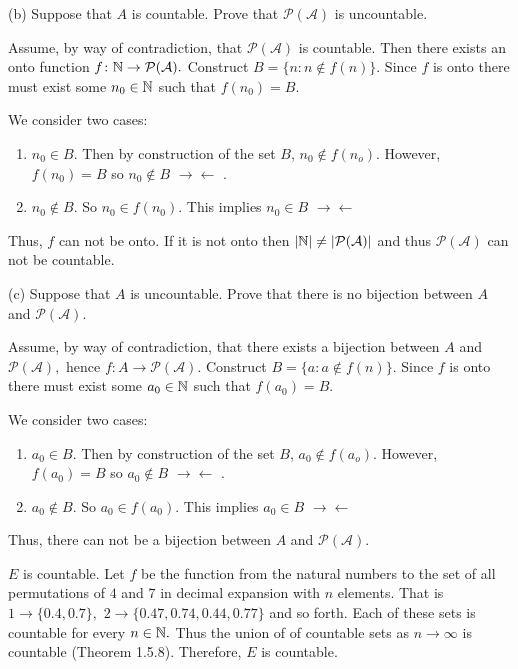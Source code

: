 \documentclass{report}
\newcommand{\contra}{
$\rightarrow\!\leftarrow$
}
\begin{document}
\bigskip
(b) Suppose that $A$ is countable. Prove that $\mathcal{P}(\mathcal{A})$ is uncountable.
\bigskip
\par
\sol

Assume, by way of contradiction, that $\mathcal{P}(\mathcal{A})$ is countable. Then there exists an onto function $f\colon \NN \rightarrow \mathcal{P}(\mathcal{A}).$ Construct $B = \{n : n \not\in f(n)\}.$  Since $f$ is onto there must exist some $n_0 \in \NN$ such that $f(n_0) = B.$

We consider two cases:
\begin{enumerate}
  \item $n_0 \in B.$ Then by construction of the set $B$, $n_0 \not\in f(n_o).$ However, $f(n_0)=B$ so $n_0 \not\in B $ \contra.
  \item $n_0 \not\in B$. So $n_0 \in f(n_0).$ This implies $n_0 \in B$ \contra
\end{enumerate}

Thus, $f$ can not be onto. If it is not onto then $|\NN| \not= |\mathcal{P}(\mathcal{A})|$ and thus $\mathcal{P}(\mathcal{A})$ can not be countable.
\bigskip

(c) Suppose that $A$ is uncountable. Prove that there is no bijection between $A$ and $\mathcal{P}(\mathcal{A})$.
\bigskip
\begin{myproof}
    
Assume, by way of contradiction, that there exists a bijection between $A$ and $\mathcal{P}(\mathcal{A}),$ hence $f\colon A \rightarrow \mathcal{P}(\mathcal{A}).$ Construct $B = \{a : a \not\in f(n)\}.$  Since $f$ is onto there must exist some $a_0 \in \NN$ such that $f(a_0) = B.$

We consider two cases:
\begin{enumerate}
  \item $a_0 \in B.$ Then by construction of the set $B$, $a_0 \not\in f(a_o).$ However, $f(a_0)=B$ so $a_0 \not\in B $ \contra.
  \item $a_0 \not\in B$. So $a_0 \in f(a_0).$ This implies $a_0 \in B$ \contra
\end{enumerate}

Thus, there can not be a bijection  between  $A$ and $\mathcal{P}(\mathcal{A}).$ 

\end{myproof}

\sol 
\begin{myproof}
$E$ is countable. Let $f$ be the function from the natural numbers to the set of all permutations of $4$ and $7$ in decimal expansion with $n$ elements. That is $1 \rightarrow \{0.4, 0.7\},$  $2 \rightarrow \{0.47, 0.74, 0.44, 0.77\}$ and so forth. Each of these sets is countable for every $n \in \NN.$ Thus the union of of countable sets as $n \rightarrow \infty$ is countable (Theorem 1.5.8). Therefore, $E$ is countable.
    
\end{myproof}
\end{document}
